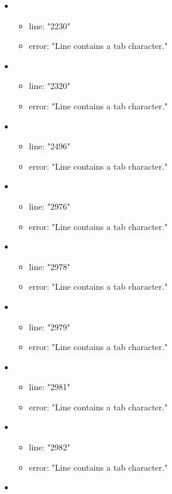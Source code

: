 \begin{itemize}
\begin{itemize}
	\end{itemize}
	\item 
	\begin{itemize} 
		\item line: "2230" 
		\item error: "Line contains a tab character." 
	\end{itemize}
	\item 
	\begin{itemize} 
		\item line: "2320" 
		\item error: "Line contains a tab character." 
	\end{itemize}
	\item 
	\begin{itemize} 
		\item line: "2496" 
		\item error: "Line contains a tab character." 
	\end{itemize}
	\item 
	\begin{itemize} 
		\item line: "2976" 
		\item error: "Line contains a tab character." 
	\end{itemize}
	\item 
	\begin{itemize} 
		\item line: "2978" 
		\item error: "Line contains a tab character." 
	\end{itemize}
	\item 
	\begin{itemize} 
		\item line: "2979" 
		\item error: "Line contains a tab character." 
	\end{itemize}
	\item 
	\begin{itemize} 
		\item line: "2981" 
		\item error: "Line contains a tab character." 
	\end{itemize}
	\item 
	\begin{itemize} 
		\item line: "2982" 
		\item error: "Line contains a tab character." 
	\end{itemize}
	\item 
	\begin{itemize} 

\end{itemize}
\end{itemize}

